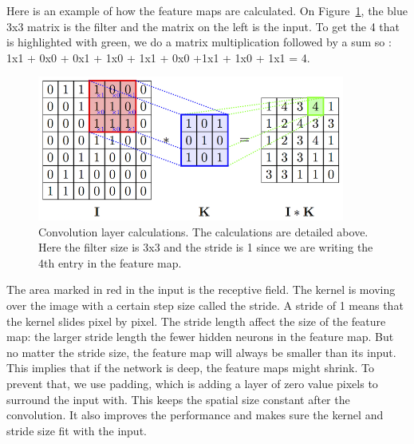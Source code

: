 Here is an example of how the feature maps are calculated. On Figure~\ref{fig:convo_calc}, the blue 3x3 matrix is the filter and the matrix on the left is the input. To get the 4 that is highlighted with green, we do a matrix multiplication followed by a sum so : 1x1 + 0x0 + 0x1 + 1x0 + 1x1 + 0x0 +1x1 + 1x0 + 1x1 = 4. 
	\begin{figure}[!htp]
    \centering
        \includegraphics[width=0.9\textwidth]{figures/02-conv_layer}
        \caption[Convolution calculations]{Convolution layer calculations. The calculations are detailed above. Here the filter size is 3x3 and the stride is 1 since we are writing the 4th entry in the feature map.}\label{fig:convo_calc}
    \end{figure}
    
The area marked  in  red in the input is the receptive field. The kernel is moving over the image with a certain step size called the stride. A stride of 1 means that the kernel slides pixel by pixel. The stride length affect the size of the feature map: the larger stride length the fewer hidden neurons in the feature map. But no matter the stride size, the feature map will always be smaller than its input. This implies that if the network is deep, the feature maps might shrink. To prevent that, we use padding, which is adding a layer of zero value pixels to surround the input with. This keeps the spatial size constant after the convolution. It also improves the performance and makes sure the kernel and stride size fit with the input. 

